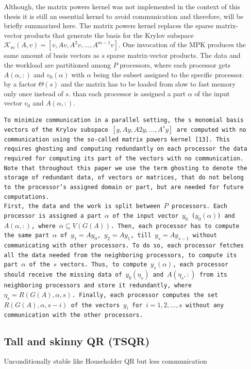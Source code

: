\documentclass{scrartcl}
\begin{document}
Although, the matrix powers kernel was not implemented in the context of this thesis it is still an essential kernel to avoid communication and therefore, will be briefly summarized here.
The matrix powers kernel replaces the sparse matrix-vector products that generate the basis for the Krylov subspace $\mathcal{K}_m(A, v) = \left[v, Av, A^2v, \ldots, A^{m-1}v\right]$. One invocation of the MPK produces the same amount of basis vectors as $s$ sparse matrix-vector products. The data and the workload are partitioned among $P$ processors, where each processor gets $A(\alpha,:)$ and $v_0(\alpha)$ with $\alpha$ being the subset assigned to the specific processor. by a factor $\Theta(s)$ and the matrix has to be loaded from slow to fast memory only once instead of $s$.  than  each processor is assigned a part $\alpha$ of the input vector $v_0$ and $A(\alpha,:)$.


\texttt{To minimize communication in a parallel setting, the s monomial basis vectors of the Krylov subspace $[y, Ay, A2y, \ldots, A^sy]$ are computed with no communication using the so-called matrix powers kernel [13]. This requires ghosting and computing redundantly on each processor the data required for computing its part of the vectors with no communication. Note that throughout this paper we use the term ghosting to denote the storage of redundant data, of vectors or matrices, that do not belong to the processor's assigned domain or part, but are needed for future computations.\\
First, the data and the work is split between $P$ processors. Each processor is assigned a part $\alpha$ of the input vector $y_0$ ($y_0(\alpha)$) and $A(\alpha, :)$, where $\alpha \subseteq V(G(A))$. Then, each processor has to compute the same part $\alpha$ of $y_1 = Ay_0$, $y_2 = Ay_1$, till $y_s = Ay_{s - 1}$ without communicating with other processors. To do so, each 
processor fetches all the data needed from the neighboring processors, to compute its part $\alpha$ of the $s$ vectors. Thus, to compute $y_s(\alpha)$, each processor should receive the missing data of $y_0(\eta_s)$ and $A(\eta_s, :)$ from its neighboring processors and store it redundantly, where $\eta_s = R(G(A), \alpha, s)$. Finally, each processor computes the set $R(G(A), \alpha, s - i)$ of the vectors $y_i$ for $i = 1, 2, \ldots, s$ without any communication with the other processors.}


\subsection{Tall and skinny QR (TSQR)}
Unconditionally stable like Householder QR but less communication
\end{document}
